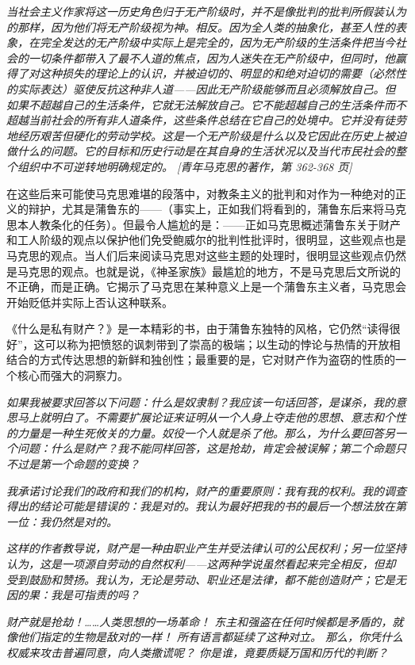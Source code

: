 \documentclass[DIV=12,%
               BCOR=0mm,%
               headinclude=false,%
               footinclude=false,open=any,%
               fontsize=10pt,%
               oneside,%
               paper=210mm:11in]%
               {scrbook}
\begin{document}
\emph{当社会主义作家将这一历史角色归于无产阶级时，并不是像批判的批判所假装认为的那样，因为他们将无产阶级视为神。相反。因为全人类的抽象化，甚至人性的表象，在完全发达的无产阶级中实际上是完全的，因为无产阶级的生活条件把当今社会的一切条件都带入了最不人道的焦点，因为人迷失在无产阶级中，但同时，他赢得了对这种损失的理论上的认识，并被迫切的、明显的和绝对迫切的需要（必然性的实际表达）驱使反抗这种非人道——因此无产阶级能够而且必须解放自己。但如果不超越自己的生活条件，它就无法解放自己。它不能超越自己的生活条件而不超越当前社会的所有非人道条件，这些条件总结在它自己的处境中。它并没有徒劳地经历艰苦但硬化的劳动学校。这是一个无产阶级是什么以及它因此在历史上被迫做什么的问题。它的目标和历史行动是在其自身的生活状况以及当代市民社会的整个组织中不可逆转地明确规定的。 [青年马克思的著作，第 362-368 页]}


在这些后来可能使马克思难堪的段落中，对教条主义的批判和对作为一种绝对的正义的辩护，尤其是蒲鲁东的——（事实上，正如我们将看到的，蒲鲁东后来将马克思本人教条化的任务）。但最令人尴尬的是：——正如马克思概述蒲鲁东关于财产和工人阶级的观点以保护他们免受鲍威尔的批判性批评时，很明显，这些观点也是马克思的观点。当人们后来阅读马克思对这些主题的处理时，很明显这些观点仍然是马克思的观点。也就是说，《神圣家族》最尴尬的地方，不是马克思后文所说的不正确，而是正确。它揭示了马克思在某种意义上是一个蒲鲁东主义者，马克思会开始贬低并实际上否认这种联系。


《什么是私有财产？》是一本精彩的书，由于蒲鲁东独特的风格，它仍然“读得很好”，这可以称为把愤怒的讽刺带到了崇高的极端；以生动的悖论与热情的开放相结合的方式传达思想的新鲜和独创性；最重要的是，它对财产作为盗窃的性质的一个核心而强大的洞察力。


\emph{如果我被要求回答以下问题：什么是奴隶制？我应该一句话回答，是谋杀，我的意思马上就明白了。不需要扩展论证来证明从一个人身上夺走他的思想、意志和个性的力量是一种生死攸关的力量。奴役一个人就是杀了他。那么，为什么要回答另一个问题：什么是财产？我不能同样回答，这是抢劫，肯定会被误解；第二个命题只不过是第一个命题的变换？}


\emph{我承诺讨论我们的政府和我们的机构，财产的重要原则：我有我的权利。我的调查得出的结论可能是错误的：我是对的。我认为最好把我的书的最后一个想法放在第一位：我仍然是对的。}


\emph{这样的作者教导说，财产是一种由职业产生并受法律认可的公民权利；另一位坚持认为，这是一项源自劳动的自然权利——这两种学说虽然看起来完全相反，但却受到鼓励和赞扬。我认为，无论是劳动、职业还是法律，都不能创造财产；它是无因的果：我是可指责的吗？}


\emph{财产就是抢劫！\dots{}\dots{}人类思想的一场革命！ 东主和强盗在任何时候都是矛盾的，就像他们指定的生物是敌对的一样！ 所有语言都延续了这种对立。 那么，你凭什么权威来攻击普遍同意，向人类撒谎呢？ 你是谁，竟要质疑万国和历代的判断？}
\end{document}
